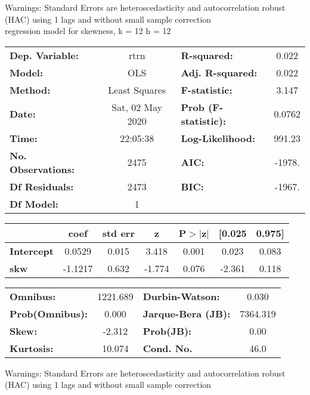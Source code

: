 Warnings: \newline
 [1] Standard Errors are heteroscedasticity and autocorrelation robust (HAC) using 1 lags and without small sample correction\\ 

regression model for skewness, k = 12 h = 12\begin{center}
\begin{tabular}{lclc}
\toprule
\textbf{Dep. Variable:}    &       rtrn       & \textbf{  R-squared:         } &     0.022   \\
\textbf{Model:}            &       OLS        & \textbf{  Adj. R-squared:    } &     0.022   \\
\textbf{Method:}           &  Least Squares   & \textbf{  F-statistic:       } &     3.147   \\
\textbf{Date:}             & Sat, 02 May 2020 & \textbf{  Prob (F-statistic):} &   0.0762    \\
\textbf{Time:}             &     22:05:38     & \textbf{  Log-Likelihood:    } &    991.23   \\
\textbf{No. Observations:} &        2475      & \textbf{  AIC:               } &    -1978.   \\
\textbf{Df Residuals:}     &        2473      & \textbf{  BIC:               } &    -1967.   \\
\textbf{Df Model:}         &           1      & \textbf{                     } &             \\
\bottomrule
\end{tabular}
\begin{tabular}{lcccccc}
                   & \textbf{coef} & \textbf{std err} & \textbf{z} & \textbf{P$> |$z$|$} & \textbf{[0.025} & \textbf{0.975]}  \\
\midrule
\textbf{Intercept} &       0.0529  &        0.015     &     3.418  &         0.001        &        0.023    &        0.083     \\
\textbf{skw}       &      -1.1217  &        0.632     &    -1.774  &         0.076        &       -2.361    &        0.118     \\
\bottomrule
\end{tabular}
\begin{tabular}{lclc}
\textbf{Omnibus:}       & 1221.689 & \textbf{  Durbin-Watson:     } &    0.030  \\
\textbf{Prob(Omnibus):} &   0.000  & \textbf{  Jarque-Bera (JB):  } & 7364.319  \\
\textbf{Skew:}          &  -2.312  & \textbf{  Prob(JB):          } &     0.00  \\
\textbf{Kurtosis:}      &  10.074  & \textbf{  Cond. No.          } &     46.0  \\
\bottomrule
\end{tabular}
\end{center}

Warnings: \newline
 [1] Standard Errors are heteroscedasticity and autocorrelation robust (HAC) using 1 lags and without small sample correction\\ 

